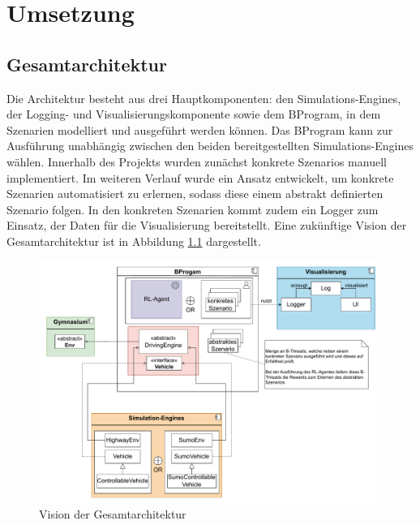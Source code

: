 \chapter{Umsetzung}

\section{Gesamtarchitektur}
Die Architektur besteht aus drei Hauptkomponenten: den Simulations-Engines, der Logging- und Visualisierungskomponente sowie dem BProgram, in dem Szenarien modelliert und ausgeführt werden können. Das BProgram kann zur Ausführung unabhängig zwischen den beiden bereitgestellten Simulations-Engines wählen. Innerhalb des Projekts wurden zunächst konkrete Szenarios manuell implementiert. Im weiteren Verlauf wurde ein Ansatz entwickelt, um konkrete Szenarien automatisiert zu erlernen, sodass diese einem abstrakt definierten Szenario folgen. In den konkreten Szenarien kommt zudem ein Logger zum Einsatz, der Daten für die Visualisierung bereitstellt. Eine zukünftige Vision der Gesamtarchitektur ist in Abbildung \ref{fig:architecture} dargestellt.

\begin{figure}[h]
    \centering
    \includegraphics[width=1\linewidth]{contents/figures/fullArchitectureVision.pdf}
    \caption{Vision der Gesamtarchitektur}
    \label{fig:architecture}
\end{figure}

